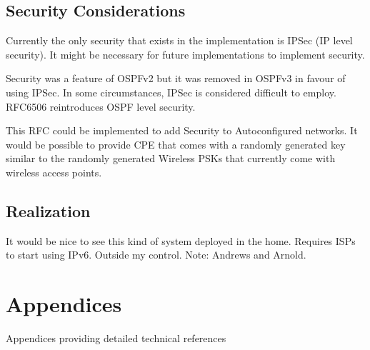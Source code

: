 \documentclass[12pt]{report}
\begin{document}
\section{Security Considerations}
Currently the only security that exists in the implementation is IPSec (IP
level security). It might be necessary for future implementations to implement
security.

Security was a feature of OSPFv2 but it was removed in OSPFv3 in favour of using 
IPSec. In some circumstances, IPSec is considered difficult to employ. RFC6506 
reintroduces OSPF level security. 

This RFC could be implemented to add Security to Autoconfigured networks. It would 
be possible to provide CPE that comes with a randomly generated key similar to the 
randomly generated Wireless PSKs that currently come with wireless access points.

\section{Realization}
It would be nice to see this kind of system deployed in the home. 
Requires ISPs to start using IPv6.
Outside my control. 
Note: Andrews and Arnold.
 
\pagebreak

\printnomenclature

\pagebreak

{}


\appendix 

\chapter{Appendices}
Appendices providing detailed technical references
\end{document}
